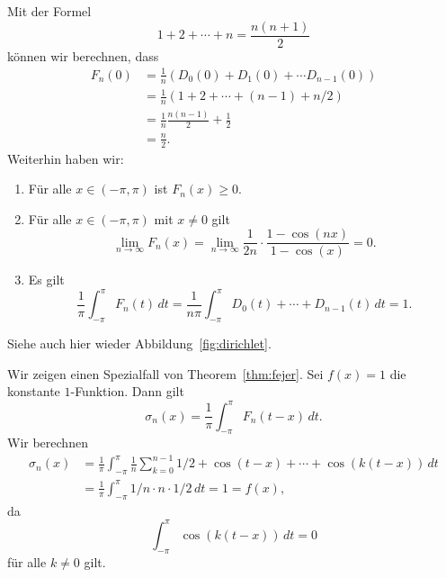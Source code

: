 \documentclass[../main.tex]{subfiles}
\begin{document}
Mit der Formel
\[
  1 + 2 + \cdots + n = \frac{n(n+1)}{2}
\]
können wir berechnen, dass
\begin{align*}
   F_n(0) 
   & = \frac{1}{n} (D_0(0) + D_1(0) + \cdots D_{n-1}(0)) \\
   &= \frac{1}{n}(1 + 2 + \cdots + (n-1) + n/2) \\
   &= \frac{1}{n} \frac{n(n-1)}{2} + \frac{1}{2}\\
   &= \frac{n}{2}.
\end{align*}
Weiterhin haben wir:
\begin{enumerate}[(1)]
  \item Für alle $x \in (-\pi, \pi)$ ist $F_n(x) \geq 0$.
  \item Für alle $x \in (- \pi, \pi)$ mit $x \neq 0$ 
    gilt 
    \[
    \lim_{n \to \infty} F_n(x) = \lim_{n \to \infty}
    \frac{1}{2n} \cdot \frac{1 - \cos(nx)}{1 - \cos(x)} = 0.
    \]
  \item Es gilt
    \[
      \frac{1}{\pi} \int_{-\pi}^{\pi} F_n(t) \, dt
      = \frac{1}{n\pi}\int_{-\pi}^{\pi} D_0(t) + \cdots + D_{n-1}(t) \, dt = 1.
    \]
\end{enumerate}
Siehe auch hier wieder Abbildung~\ref{fig:dirichlet}.

\begin{example}
  Wir zeigen einen Spezialfall von Theorem~\ref{thm:fejer}.
  Sei $f(x) = 1$ die konstante $1$-Funktion.
  Dann gilt
  \[
    \sigma_n(x) = \frac{1}{\pi} \int_{-\pi}^{\pi} F_n(t-x) \, dt.
  \]
  Wir berechnen
  \begin{align*}
    \sigma_n(x)
    & = \frac{1}{\pi} \int_{-\pi}^{\pi} \frac{1}{n} \sum_{k=0}^{n-1}
    1/2 + \cos(t-x) + \cdots + \cos(k(t-x)) \, dt\\
    &= \frac{1}{\pi} \int_{-\pi}^{\pi} 1/n \cdot n \cdot 1/2 \, dt
    = 1 = f(x),
  \end{align*}
  da
  \[
    \int_{-\pi}^{\pi} \cos(k(t-x)) \, dt = 0
  \]
  für alle $k \neq 0$ gilt.
\end{example}
\end{document}
